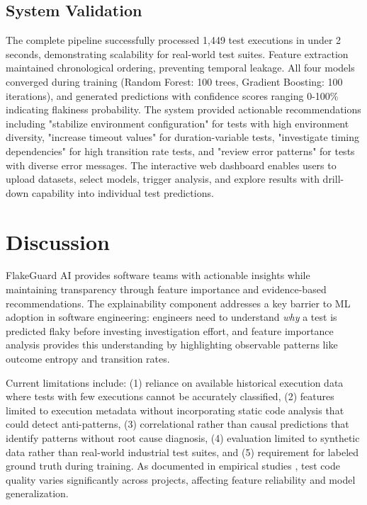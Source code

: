 \documentclass[conference]{IEEEtran}
\begin{document}
\subsection{System Validation}
The complete pipeline successfully processed 1,449 test executions in under 2 seconds, demonstrating scalability for real-world test suites. Feature extraction maintained chronological ordering, preventing temporal leakage. All four models converged during training (Random Forest: 100 trees, Gradient Boosting: 100 iterations), and generated predictions with confidence scores ranging 0-100\% indicating flakiness probability. The system provided actionable recommendations including "stabilize environment configuration" for tests with high environment diversity, "increase timeout values" for duration-variable tests, "investigate timing dependencies" for high transition rate tests, and "review error patterns" for tests with diverse error messages. The interactive web dashboard enables users to upload datasets, select models, trigger analysis, and explore results with drill-down capability into individual test predictions.

\section{Discussion}
FlakeGuard AI provides software teams with actionable insights while maintaining transparency through feature importance and evidence-based recommendations. The explainability component addresses a key barrier to ML adoption in software engineering: engineers need to understand \textit{why} a test is predicted flaky before investing investigation effort, and feature importance analysis provides this understanding by highlighting observable patterns like outcome entropy and transition rates.

Current limitations include: (1) reliance on available historical execution data where tests with few executions cannot be accurately classified, (2) features limited to execution metadata without incorporating static code analysis that could detect anti-patterns, (3) correlational rather than causal predictions that identify patterns without root cause diagnosis, (4) evaluation limited to synthetic data rather than real-world industrial test suites, and (5) requirement for labeled ground truth during training. As documented in empirical studies \cite{vahabzadeh2015empirical}, test code quality varies significantly across projects, affecting feature reliability and model generalization.
\end{document}
